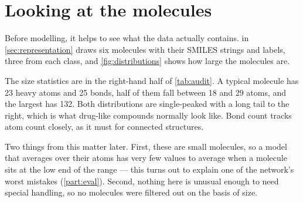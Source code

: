 \section{Looking at the molecules}
\label{part:mol}

Before modelling, it helps to see what the data actually contains.  in \ref{sec:representation} draws six molecules with their SMILES strings and labels, three from each class, and \cref{fig:distributions} shows how large the molecules are.

The size statistics are in the right-hand half of \cref{tab:audit}. A typical molecule has 23 heavy atoms and 25 bonds, half of them fall between 18 and 29 atoms, and the largest has 132. Both distributions are single-peaked with a long tail to the right, which is what drug-like compounds normally look like. Bond count tracks atom count closely, as it must for connected structures.

Two things from this matter later. First, these are small molecules, so a model that averages over their atoms has very few values to average when a molecule sits at the low end of the range --- this turns out to explain one of the network's worst mistakes (\ref{part:eval}). Second, nothing here is unusual enough to need special handling, so no molecules were filtered out on the basis of size.
